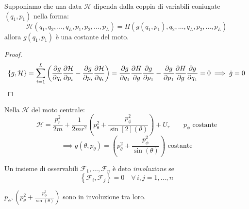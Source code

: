 \begin{proposition}
    Supponiamo che una data $\mathcal{H}$ dipenda dalla coppia di variabili coniugate $(q_1,p_1)$ nella forma:
    \begin{equation}
        \mathcal{H}(q_1,q_2,\dots,q_L,p_1,p_2,\dots,p_L)= H (g(q_1,p_1),q_2,\dots,q_L,p_2,\dots,p_L)
    \end{equation}
    allora $g(q_1,p_1)$ è una costante del moto.
\end{proposition}

\begin{proof}
    \begin{equation}
        \left\{ g,\mathcal{H} \right\}=\sum_{i=1}^{L}\left( \pdv{g}{q_i}\pdv{\mathcal{H}}{p_i}-\pdv{g}{p_i}\pdv{\mathcal{H}}{q_i} \right)
        =\pdv{g}{q_1}\pdv{H}{g}\pdv{g}{p_1}-\pdv{g}{p_1}\pdv{H}{g}\pdv{g}{q_1}=0\implies \dot{g}=0
    \end{equation}
\end{proof}

\begin{remark}
    Nella $\mathcal{H}$ del moto centrale:
    \begin{equation}
        \mathcal{H}= \frac{p_r^2}{2m}+ \frac{1}{2mr^2}\left( p_\theta^2 + \frac{p_\phi^2}{\sin[2](\theta)}\right)+ U_r
        \qquad p_\phi \text{ costante}   
    \end{equation}
    \begin{equation}
        \implies g(\theta, p_\theta)= \left( p_\theta^2+\frac{p_\phi^2}{\sin(\theta)} \right) \text{  costante}
    \end{equation}
\end{remark}

\begin{definition}
    Un insieme di osservabili $\mathcal{F}_1,\dots, \mathcal{F}_n $ è deto \textit{involuzione} se 
    \begin{equation}
        \left\{ \mathcal{F}_i,\mathcal{F}_j \right\}  = 0\quad  \forall\,i,j= 1,\dots, n  
    \end{equation}
\end{definition}

\begin{remark}
    $p_\phi, \left( p_\theta^2+\frac{p_\phi^2}{\sin(\theta)} \right)$ sono in involuzione tra loro.
\end{remark}

